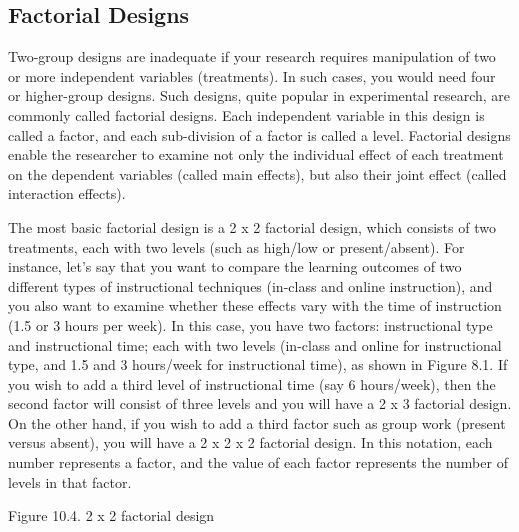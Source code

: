 \subsection{Factorial Designs}

Two-group designs are inadequate if your research requires manipulation of two or more independent variables (treatments). In such cases, you would need four or higher-group designs. Such designs, quite popular in experimental research, are commonly called factorial designs. Each independent variable in this design is called a factor, and each sub-division of a factor is called a level. Factorial designs enable the researcher to examine not only the individual effect of each treatment on the dependent variables (called main effects), but also their joint effect (called interaction effects).

The most basic factorial design is a 2 x 2 factorial design, which consists of two treatments, each with two levels (such as high/low or present/absent). For instance, let’s say that you want to compare the learning outcomes of two different types of instructional techniques (in-class and online instruction), and you also want to examine whether these effects vary with the time of instruction (1.5 or 3 hours per week). In this case, you have two factors: instructional type and instructional time; each with two levels (in-class and online for instructional type, and 1.5 and 3 hours/week for instructional time), as shown in Figure 8.1. If you wish to add a third level of instructional time (say 6 hours/week), then the second factor will consist of three levels and you will have a 2 x 3 factorial design. On the other hand, if you wish to add a third factor such as group work (present versus absent), you will have a 2 x 2 x 2 factorial design. In this notation, each number represents a factor, and the value of each factor represents the number of levels in that factor.

Figure 10.4. 2 x 2 factorial design

